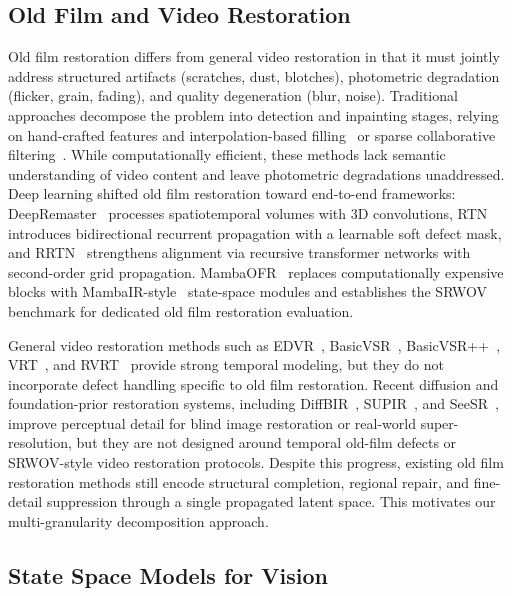 \documentclass[symmetry,article,submit,pdftex,moreauthors]{Definitions/mdpi}
\begin{document}
\subsection{Old Film and Video Restoration}
\label{subsec:ofr}

Old film restoration differs from general video restoration in that it must jointly address structured artifacts (scratches, dust, blotches), photometric degradation (flicker, grain, fading), and quality degeneration (blur, noise). Traditional approaches decompose the problem into detection and inpainting stages, relying on hand-crafted features and interpolation-based filling~\cite{kokaram2004missing} or sparse collaborative filtering~\cite{dabov2007bm3d,he2013guided}. While computationally efficient, these methods lack semantic understanding of video content and leave photometric degradations unaddressed. Deep learning shifted old film restoration toward end-to-end frameworks: DeepRemaster~\cite{iizuka2019deepremaster} processes spatiotemporal volumes with 3D convolutions, RTN~\cite{wan2022rtn} introduces bidirectional recurrent propagation with a learnable soft defect mask, and RRTN~\cite{lin2024rrtn} strengthens alignment via recursive transformer networks with second-order grid propagation. MambaOFR~\cite{mao2025mambaofr} replaces computationally expensive blocks with MambaIR-style~\cite{guo2024mambair} state-space modules and establishes the SRWOV benchmark for dedicated old film restoration evaluation.

General video restoration methods such as EDVR~\cite{wang2019edvr}, BasicVSR~\cite{chan2021basicvsr}, BasicVSR++~\cite{chan2022basicvsrpp}, VRT~\cite{liang2024vrt}, and RVRT~\cite{liang2022rvrt} provide strong temporal modeling, but they do not incorporate defect handling specific to old film restoration. Recent diffusion and foundation-prior restoration systems, including DiffBIR~\cite{lin2024diffbir}, SUPIR~\cite{yu2024supir}, and SeeSR~\cite{wu2024seesr}, improve perceptual detail for blind image restoration or real-world super-resolution, but they are not designed around temporal old-film defects or SRWOV-style video restoration protocols. Despite this progress, existing old film restoration methods still encode structural completion, regional repair, and fine-detail suppression through a single propagated latent space. This motivates our multi-granularity decomposition approach.

\subsection{State Space Models for Vision}
\label{subsec:ssm}
\end{document}
